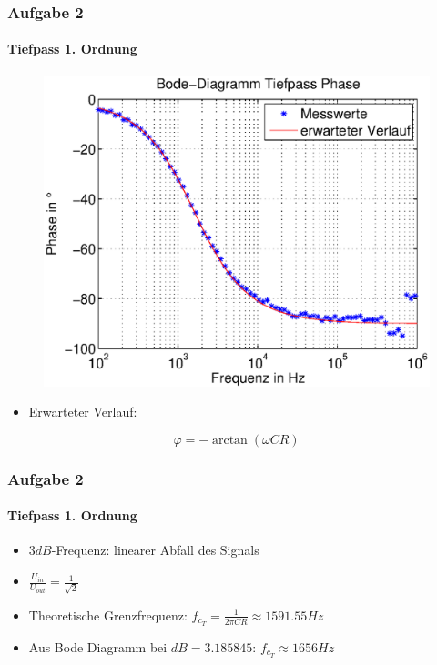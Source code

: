 \begin{frame}
\frametitle{Aufgabe 2}
\framesubtitle{Tiefpass 1. Ordnung}
\begin{figure}[H]
\begin{center}
        \includegraphics[scale=0.50]{./img/2a_bode_tief_phase.eps}
\end{center}
\end{figure}
\begin{itemize}
    \item Erwarteter Verlauf:
\end{itemize}
\begin{equation*}
    \varphi = - \arctan \left( \omega C R \right)
\end{equation*}
\end{frame}
\begin{frame}
    \frametitle{Aufgabe 2}
    \framesubtitle{Tiefpass 1. Ordnung}
\begin{itemize}
    \item $3dB$-Frequenz: linearer Abfall des Signals
    \item $\frac{U_{in}}{U_{out}}=\frac{1}{\sqrt{2}}$
    \item Theoretische Grenzfrequenz: $f_{c_T} = \frac{1}{2 \pi C R} \approx
    1591.55Hz$
    \item Aus Bode Diagramm bei $dB=3.185845$: $f_{c_T} \approx 1656 Hz$
\end{itemize}
\end{frame}

